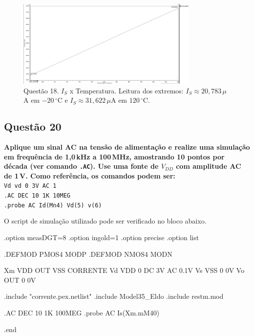 \documentclass[12pt,a4paper]{article}
\newcommand{\degree}{\ensuremath{{}^\circ}}
\begin{document}
\begin{figure}[H]
    \centering
    \includegraphics[width=0.8\textwidth]{images/18.png}
    \caption{Questão 18. $I_S$ x Temperatura. Leitura dos extremos: $I_S\approx 20{,}783\,\mu$A em $-20\,\degree$C e $I_S\approx 31{,}622\,\mu$A em $120\,\degree$C.}
    \label{fig:q18_is_temp}
\end{figure}


\subsection*{Questão 20}
\begin{BoxQ}
    	\textbf{Aplique um sinal AC na tensão de alimentação e realize uma simulação em frequência de 1{,}0\,kHz a 100\,MHz, amostrando 10 pontos por década (ver comando \texttt{.AC}). Use uma fonte de $V_{DD}$ com amplitude AC de 1\,V. Como referência, os comandos podem ser:}\\
    	\texttt{Vd vd 0 3V AC 1}\\
    	\texttt{.AC DEC 10 1K 10MEG}\\
    	\texttt{.probe AC Id(Mn4) Vd(5) v(6)}
\end{BoxQ}

O script de simulação utilizado pode ser verificado no bloco abaixo.

\begin{codeblock}[title={Script de simulação (Questão 20)}]
.option measDGT=8
.option ingold=1
.option precise
.option list

.DEFMOD PMOS4 MODP
.DEFMOD NMOS4 MODN

Xm VDD OUT VSS CORRENTE
Vd VDD 0 DC 3V AC 0.1V
Vs VSS 0 0V
Vo OUT 0 0V

.include "corrente.pex.netlist"
.include Model35_Eldo
.include restm.mod

.AC DEC 10 1K 100MEG
.probe AC Is(Xm.mM40)

.end
\end{codeblock}
\end{document}
